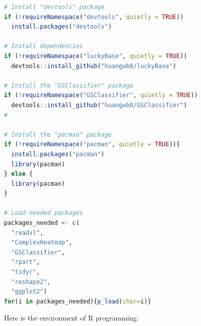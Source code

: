 \documentclass[
  12pt,
]{book}
\begin{document}
\begin{lstlisting}[language=R]
# Install "devtools" package
if (!requireNamespace("devtools", quietly = TRUE))
  install.packages("devtools")

# Install dependencies
if (!requireNamespace("luckyBase", quietly = TRUE))
  devtools::install_github("huangwb8/luckyBase")

# Install the "GSClassifier" package
if (!requireNamespace("GSClassifier", quietly = TRUE))
  devtools::install_github("huangwb8/GSClassifier")
# 

# Install the "pacman" package
if (!requireNamespace("pacman", quietly = TRUE)){
  install.packages("pacman")
  library(pacman)
} else {
  library(pacman)
}

# Load needed packages
packages_needed <- c(
  "readxl",
  "ComplexHeatmap",
  "GSClassifier",
  "rpart",
  "tidyr",
  "reshape2",
  "ggplot2")
for(i in packages_needed){p_load(char=i)}
\end{lstlisting}

Here is the environment of R programming:
\end{document}
